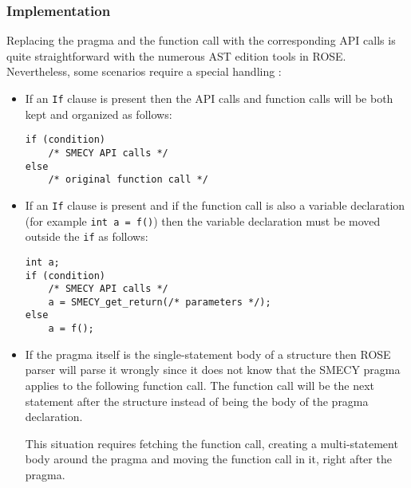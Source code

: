 \documentclass[a4paper]{article}
\begin{document}
	\subsubsection{Implementation} Replacing the pragma and the function call with the corresponding API calls is quite straightforward with the numerous AST edition tools in ROSE. Nevertheless, some scenarios require a special handling :
	\begin{itemize}
		\item If an \verb+If+ clause is present then the API calls and
          function calls will be both kept and organized as follows:
		\begin{lstlisting}[frame=none, numbers=none]
if (condition)
	/* SMECY API calls */
else
	/* original function call */
		\end{lstlisting}
		\item If an \verb+If+ clause is present and if the function call is also a variable declaration (for example \verb+int a = f()+) then the variable declaration must be moved outside the \verb+if+ as follows:
		\begin{lstlisting}[frame=none, numbers=none]
int a;
if (condition)
	/* SMECY API calls */
	a = SMECY_get_return(/* parameters */);
else
	a = f();
		\end{lstlisting}
		\item If the pragma itself is the single-statement body of a
          structure  then ROSE parser will parse it wrongly since it
          does not know that the SMECY pragma applies to the following
          function call. The function call will be the next statement
          after the structure instead of being the body of the pragma
          declaration.

		This situation requires fetching the function call, creating a multi-statement body around the pragma and moving the function call in it, right after the pragma.
	\end{itemize}
	
\end{document}
